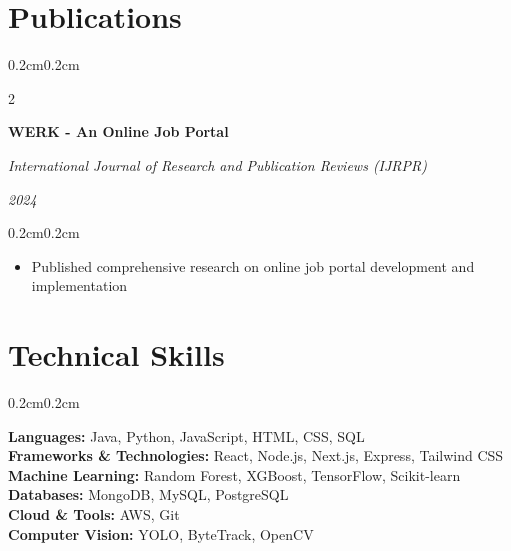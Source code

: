 \documentclass[10pt, letterpaper]{article}
\newenvironment{highlights}{
    \begin{itemize}[
        topsep=0.10cm,
        parsep=0.10cm,
        partopsep=0pt,
        itemsep=0pt,
        leftmargin=0.4cm + 10pt
    ]
}{\end{itemize}}
\newenvironment{onecolentry}{
    \begin{adjustwidth}{0.2cm}{0.2cm}
}{\end{adjustwidth}}
\newenvironment{twocolentry}[2][]{
    \onecolentry
    \def\secondColumn{#2}
    \setcolumnwidth{\fill, 4.5cm}
    \begin{paracol}{2}
}{
    \switchcolumn \raggedleft \secondColumn
    \end{paracol}
    \endonecolentry
}
\begin{document}
    \section{Publications}
    
    \begin{twocolentry}{
        \textit{2024}
    }
        \textbf{WERK - An Online Job Portal}
        
        \textit{International Journal of Research and Publication Reviews (IJRPR)}
    \end{twocolentry}
    
    \vspace{0.10 cm}
    \begin{onecolentry}
        \begin{highlights}
            \item Published comprehensive research on online job portal development and implementation
        \end{highlights}
    \end{onecolentry}

    \section{Technical Skills}
    \begin{onecolentry}
        \textbf{Languages:} Java, Python, JavaScript, HTML, CSS, SQL \\
        \textbf{Frameworks \& Technologies:} React, Node.js, Next.js, Express, Tailwind CSS \\
        \textbf{Machine Learning:} Random Forest, XGBoost, TensorFlow, Scikit-learn \\
        \textbf{Databases:} MongoDB, MySQL, PostgreSQL \\
        \textbf{Cloud \& Tools:} AWS, Git \\
        \textbf{Computer Vision:} YOLO, ByteTrack, OpenCV
    \end{onecolentry}
\end{document}
